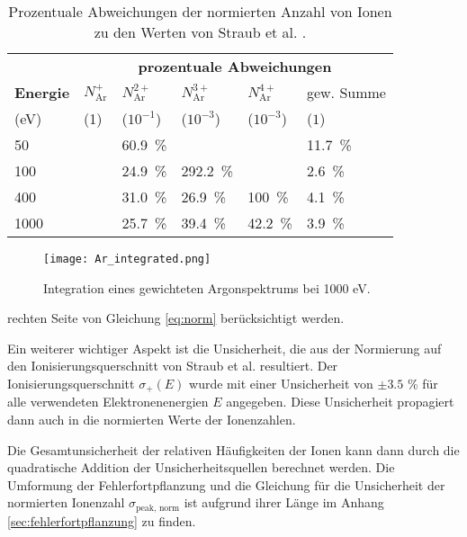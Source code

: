 \begin{samepage}
    \begin{table}
        \centering
        \caption[Prozentuale Abweichungen zu Straub et al.]{Prozentuale Abweichungen der normierten Anzahl von Ionen zu den Werten von Straub et al. \cite{Straub}.}
        \small
        \label{tab:abweichungen}
        \begin{tabular}{llllll}
            \toprule
            \text{} & \multicolumn{5}{c}{\textbf{prozentuale Abweichungen}} \\ 
    
            \textbf{Energie} & $N_\text{Ar}^+$ & $N_\text{Ar}^{2+}$ & $N_\text{Ar}^{3+}$ & $N_\text{Ar}^{4+}$ & gew. Summe \\
            (eV) & (1) & ($10^{-1}$) & ($10^{-3}$) & ($10^{-3}$) & ($1$) \\
            \midrule
            50  & {}  & {60.9\ \%} & {}  & {}  & {11.7\ \%}   \\
            100 & {}  & 24.9\ \% & 292.2\ \% & {} & 2.6\ \% \\
            400 & {}  & 31.0\ \% & 26.9\ \% & 100\ \% & 4.1\ \% \\
            1000 & {}  & 25.7\ \% & 39.4\ \% & 42.2\ \% & 3.9\ \% \\
            \bottomrule
        \end{tabular}
    \end{table}
\end{samepage}

\begin{figure}
    \hspace{-1.1cm}\texttt{[image: Ar\_integrated.png]}
    \caption[Integration eines, auf die Werte von Straub et al. gewichteten, Argonspektrums bei 1000 eV]{Integration eines gewichteten Argonspektrums bei 1000 eV.}
    \label{fig:ar_ratio}
\end{figure}

rechten Seite von Gleichung \ref{eq:norm} berücksichtigt werden.

Ein weiterer wichtiger Aspekt ist die Unsicherheit, die aus der Normierung auf den Ionisierungsquerschnitt von Straub et al. resultiert. Der Ionisierungsquerschnitt $\sigma_+(E)$ wurde mit einer Unsicherheit von $\pm 3.5$ \% für alle verwendeten Elektronenenergien $E$ angegeben. Diese Unsicherheit propagiert dann auch in die normierten Werte der Ionenzahlen. 

Die Gesamtunsicherheit der relativen Häufigkeiten der Ionen kann dann durch die quadratische Addition der Unsicherheitsquellen berechnet werden. Die Umformung der Fehlerfortpflanzung und die Gleichung für die Unsicherheit der normierten Ionenzahl $\sigma_\text{peak, norm}$ ist aufgrund ihrer Länge im Anhang \ref{sec:fehlerfortpflanzung} zu finden.

